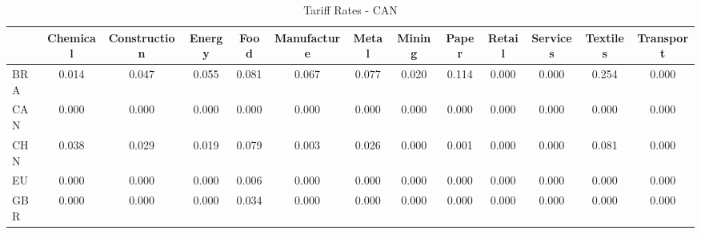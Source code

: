 \begin{table}[htbp]
\centering
\caption{Tariff Rates - CAN} 
\label{tab:tariffs_CAN}
\begin{tabular}{lcccccccccccc}
  \hline
 & Chemical & Construction & Energy & Food & Manufacture & Metal & Mining & Paper & Retail & Services & Textiles & Transport \\ 
  \hline
BRA & \textcolor[RGB]{66,43,189}{0.014} & \textcolor[RGB]{34,22,221}{0.047} & \textcolor[RGB]{32,21,223}{0.055} & \textcolor[RGB]{15,10,240}{0.081} & \textcolor[RGB]{30,19,225}{0.067} & \textcolor[RGB]{23,15,232}{0.077} & \textcolor[RGB]{55,36,200}{0.020} & \textcolor[RGB]{6,4,249}{0.114} & \textcolor[RGB]{255,165,0}{0.000} & \textcolor[RGB]{255,165,0}{0.000} & \textcolor[RGB]{0,0,255}{0.254} & \textcolor[RGB]{255,165,0}{0.000} \\ 
  CAN & \textcolor[RGB]{255,165,0}{0.000} & \textcolor[RGB]{255,165,0}{0.000} & \textcolor[RGB]{255,165,0}{0.000} & \textcolor[RGB]{255,165,0}{0.000} & \textcolor[RGB]{255,165,0}{0.000} & \textcolor[RGB]{255,165,0}{0.000} & \textcolor[RGB]{255,165,0}{0.000} & \textcolor[RGB]{255,165,0}{0.000} & \textcolor[RGB]{255,165,0}{0.000} & \textcolor[RGB]{255,165,0}{0.000} & \textcolor[RGB]{255,165,0}{0.000} & \textcolor[RGB]{255,165,0}{0.000} \\ 
  CHN & \textcolor[RGB]{40,26,215}{0.038} & \textcolor[RGB]{49,32,206}{0.029} & \textcolor[RGB]{57,37,198}{0.019} & \textcolor[RGB]{21,14,234}{0.079} & \textcolor[RGB]{91,59,164}{0.003} & \textcolor[RGB]{51,33,204}{0.026} & \textcolor[RGB]{255,165,0}{0.000} & \textcolor[RGB]{100,65,155}{0.001} & \textcolor[RGB]{255,165,0}{0.000} & \textcolor[RGB]{255,165,0}{0.000} & \textcolor[RGB]{17,11,238}{0.081} & \textcolor[RGB]{255,165,0}{0.000} \\ 
  EU & \textcolor[RGB]{255,165,0}{0.000} & \textcolor[RGB]{255,165,0}{0.000} & \textcolor[RGB]{255,165,0}{0.000} & \textcolor[RGB]{87,56,168}{0.006} & \textcolor[RGB]{108,70,147}{0.000} & \textcolor[RGB]{255,165,0}{0.000} & \textcolor[RGB]{255,165,0}{0.000} & \textcolor[RGB]{255,165,0}{0.000} & \textcolor[RGB]{255,165,0}{0.000} & \textcolor[RGB]{255,165,0}{0.000} & \textcolor[RGB]{255,165,0}{0.000} & \textcolor[RGB]{255,165,0}{0.000} \\ 
  GBR & \textcolor[RGB]{255,165,0}{0.000} & \textcolor[RGB]{255,165,0}{0.000} & \textcolor[RGB]{255,165,0}{0.000} & \textcolor[RGB]{45,29,210}{0.034} & \textcolor[RGB]{255,165,0}{0.000} & \textcolor[RGB]{255,165,0}{0.000} & \textcolor[RGB]{255,165,0}{0.000} & \textcolor[RGB]{255,165,0}{0.000} & \textcolor[RGB]{255,165,0}{0.000} & \textcolor[RGB]{255,165,0}{0.000} & \textcolor[RGB]{255,165,0}{0.000} & \textcolor[RGB]{255,165,0}{0.000} \\ 

\end{tabular}
\end{table}
